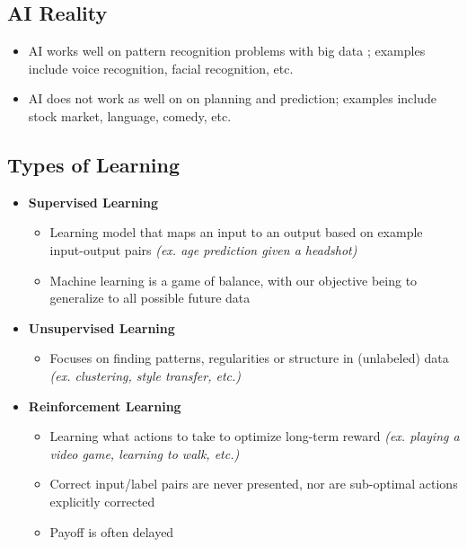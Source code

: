 \documentclass[11pt]{article}
\begin{document}
\subsection{AI Reality}
\begin{itemize}
\item AI works well on pattern recognition problems with big data  ; examples include voice recognition, facial recognition, etc.
\item AI does not work as well on on planning and prediction; examples include stock market, language, comedy, etc.
\end{itemize}

\subsection{Types of Learning}
\begin{itemize}
\item \textbf{Supervised Learning}
\begin{itemize}
\item Learning model that maps an input to an output based on example input-output pairs \textit{(ex. age prediction given a headshot)}
\item Machine learning is a game of balance, with our objective being to generalize to all possible future data
\end{itemize}
\item \textbf{Unsupervised Learning}
\begin{itemize}
\item Focuses on finding patterns, regularities or structure in (unlabeled) data \textit{(ex. clustering,  style transfer, etc.)}
\end{itemize}
\item \textbf{Reinforcement Learning}
\begin{itemize}
\item Learning what actions to take to optimize long-term reward \textit{(ex. playing a video game,  learning to walk, etc.)}
\item Correct input/label pairs are never presented, nor are sub-optimal actions explicitly corrected
\item Payoff is often delayed
\end{itemize}
\end{itemize}
\end{document}
